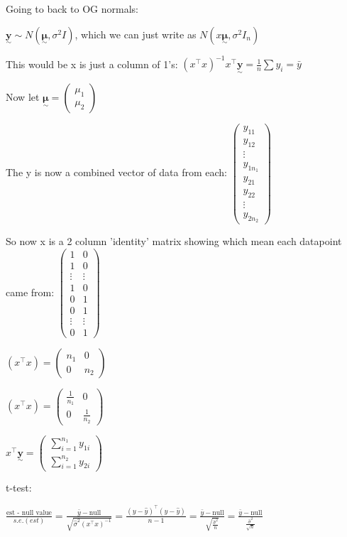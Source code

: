 \documentclass{article}
\newcommand{\svec}[1]{\underset{\sim}{\bm{#1}}} %
\let\Oldsum=\sum
\renewcommand{\sum}{\Oldsum\limits}
\begin{document}
Going to back to OG normals: 

$\svec{y} \sim N(\svec{\mu}, \sigma^2 I)$, which we can just write as $N(x\svec{\mu}, \sigma^2 I_n)$

This would be x is just a column of 1's: $(x^{\top}x)^{-1}x^{\top}\svec{y} = \frac{1}{n}\sum y_i = \bar{y}$

Now let $\svec{\mu} = \begin{pmatrix} \mu_1 \\ \mu_2 \end{pmatrix}$

The y is now a combined vector of data from each: $\begin{pmatrix} y_{11} \\ y_{12} \\ \vdots \\ y_{1 n_1} \\ y_{21} \\ y_{22} \\ \vdots \\ y_{2 n_2} \end{pmatrix}$

So now x is a 2 column 'identity' matrix showing which mean each datapoint came from: $\begin{pmatrix} 1 & 0 \\ 1 & 0 \\ \vdots & \vdots \\ 1 & 0 \\ 0 & 1 \\ 0 & 1 \\ \vdots & \vdots\\ 0 & 1 \end{pmatrix}$

$(x^{\top}x) = \begin{pmatrix} n_1 & 0 \\ 0 & n_2 \end{pmatrix}$

$(x^{\top}x) = \begin{pmatrix} \frac{1}{n_1} & 0 \\ 0 & \frac{1}{n_2} \end{pmatrix}$

$x^{\top}\svec{y} = \begin{pmatrix} \sum_{i=1}^{n_1} y_{1i} \\ \sum_{i=1}^{n_2} y_{2i} \end{pmatrix}$


t-test: 

$\frac{\text{est - null value}}{s.e.(est)} = \frac{\bar{y} - \text{null}}{\sqrt{\hat{\sigma}^2(x^{\top}x)^{-1}}} = \frac{(y-\hat{y})^{\top}(y-\hat{y})}{n-1} = \frac{\bar{y} - \text{null}}{\sqrt{\frac{\hat{\sigma}^2}{n}}} = \frac{\bar{y} - \text{null}}{\frac{\hat{\sigma}^2}{\sqrt{n}}}$
\end{document}

